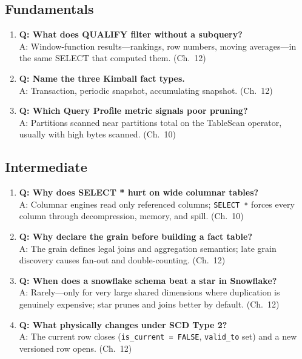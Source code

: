 \subsection{Fundamentals}
\begin{enumerate}
    \item \textbf{Q: What does QUALIFY filter without a subquery?}\\
    A: Window-function results---rankings, row numbers, moving averages---in the same SELECT that computed them. (Ch.~12)
    \item \textbf{Q: Name the three Kimball fact types.}\\
    A: Transaction, periodic snapshot, accumulating snapshot. (Ch.~12)
    \item \textbf{Q: Which Query Profile metric signals poor pruning?}\\
    A: Partitions scanned near partitions total on the TableScan operator, usually with high bytes scanned. (Ch.~10)
\end{enumerate}

\subsection{Intermediate}
\begin{enumerate}
    \item \textbf{Q: Why does SELECT * hurt on wide columnar tables?}\\
    A: Columnar engines read only referenced columns; \texttt{SELECT *} forces every column through decompression, memory, and spill. (Ch.~10)
    \item \textbf{Q: Why declare the grain before building a fact table?}\\
    A: The grain defines legal joins and aggregation semantics; late grain discovery causes fan-out and double-counting. (Ch.~12)
    \item \textbf{Q: When does a snowflake schema beat a star in Snowflake?}\\
    A: Rarely---only for very large shared dimensions where duplication is genuinely expensive; star prunes and joins better by default. (Ch.~12)
    \item \textbf{Q: What physically changes under SCD Type 2?}\\
    A: The current row closes (\texttt{is\_current = FALSE}, \texttt{valid\_to} set) and a new versioned row opens. (Ch.~12)
\end{enumerate}

